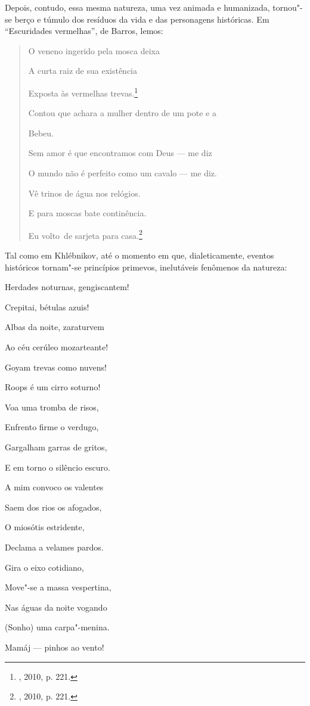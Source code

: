 Depois, contudo, essa mesma natureza, uma vez animada e humanizada,
tornou"-se berço e túmulo dos resíduos da vida e das personagens
históricas. Em ``Escuridades vermelhas'', de Barros, lemos:

\begin{quote}
O veneno ingerido pela mosca deixa

A curta raiz de sua existência

Exposta às vermelhas trevas.\footnote{, 2010, p. 221.}

Contou que achara a mulher dentro de um pote e a

Bebeu.

Sem amor é que encontramos com Deus --- me diz

O mundo não é perfeito como um cavalo --- me diz.

Vê trinos de água nos relógios.

E para moscas bate continência.

Eu volto~de sarjeta para casa.\footnote{, 2010, p. 221.}
\end{quote}

Tal como em Khlébnikov, até o momento em que, dialeticamente, eventos
históricos tornam"-se princípios primevos, inelutáveis fenômenos da
natureza:

Herdades noturnas, gengiscantem!

Crepitai, bétulas azuis!

Albas da noite, zaraturvem

Ao céu cerúleo mozarteante!

Goyam trevas como nuvens!

Roops é um cirro soturno!

Voa uma tromba de risos,

Enfrento firme o verdugo,

Gargalham garras de gritos,

E em torno o silêncio escuro.

A mim convoco os valentes

Saem dos rios os afogados,

O miosótis estridente,

Declama a velames pardos.

Gira o eixo cotidiano,

Move"-se a massa vespertina,

Nas águas da noite vogando

(Sonho) uma carpa"-menina.

Mamáj --- pinhos ao vento!

